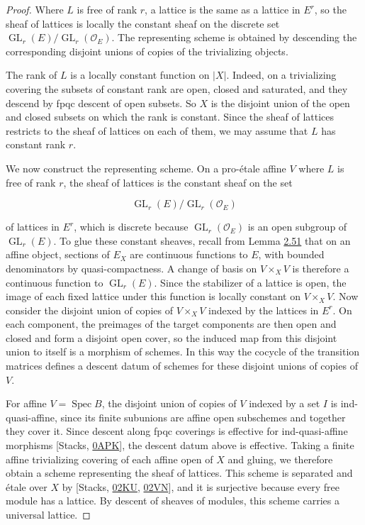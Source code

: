 \documentclass[11pt]{article}
\providecommand{\GL}{}\renewcommand{\GL}{\operatorname{GL}}
\begin{document}
\begin{proof}[{Proof}]\label{bp241}%
Where \(L\) is free of rank \(r\), a lattice is the same as a lattice in \(E^r\), so the sheaf of lattices is locally the constant sheaf on the discrete set \(\GL_r(E)/\GL_r(\mathcal O_E)\). The representing scheme is obtained by descending the corresponding disjoint unions of copies of the trivializing objects.

The rank of \(L\) is a locally constant function on \(|X|\). Indeed, on a trivializing covering the subsets of constant rank are open, closed and saturated, and they descend by fpqc descent of open subsets. So \(X\) is the disjoint union of the open and closed subsets on which the rank is constant. Since the sheaf of lattices restricts to the sheaf of lattices on each of them, we may assume that \(L\) has constant rank \(r\).

We now construct the representing scheme. On a pro-étale affine \(V\) where \(L\) is free of rank \(r\), the sheaf of lattices is the constant sheaf on the set

\[
\GL_r(E)/\GL_r(\mathcal O_E)
\]

of lattices in \(E^r\), which is discrete because \(\GL_r(\mathcal O_E)\) is an open subgroup of \(\GL_r(E)\). To glue these constant sheaves, recall from Lemma \hyperref[bp158]{2.51} that on an affine object, sections of \(E_X\) are continuous functions to \(E\), with bounded denominators by quasi-compactness. A change of basis on \(V\times_XV\) is therefore a continuous function to \(\GL_r(E)\). Since the stabilizer of a lattice is open, the image of each fixed lattice under this function is locally constant on \(V\times_XV\). Now consider the disjoint union of copies of \(V\times_XV\) indexed by the lattices in \(E^r\). On each component, the preimages of the target components are then open and closed and form a disjoint open cover, so the induced map from this disjoint union to itself is a morphism of schemes. In this way the cocycle of the transition matrices defines a descent datum of schemes for these disjoint unions of copies of \(V\).

For affine \(V=\operatorname{Spec}B\), the disjoint union of copies of \(V\) indexed by a set \(I\) is ind-quasi-affine, since its finite subunions are affine open subschemes and together they cover it. Since descent along fpqc coverings is effective for ind-quasi-affine morphisms [Stacks, \href{https://stacks.math.columbia.edu/tag/0APK}{0APK}], the descent datum above is effective. Taking a finite affine trivializing covering of each affine open of \(X\) and gluing, we therefore obtain a scheme representing the sheaf of lattices. This scheme is separated and étale over \(X\) by [Stacks, \href{https://stacks.math.columbia.edu/tag/02KU}{02KU}, \href{https://stacks.math.columbia.edu/tag/02VN}{02VN}], and it is surjective because every free module has a lattice. By descent of sheaves of modules, this scheme carries a universal lattice.
\end{proof}
\end{document}
